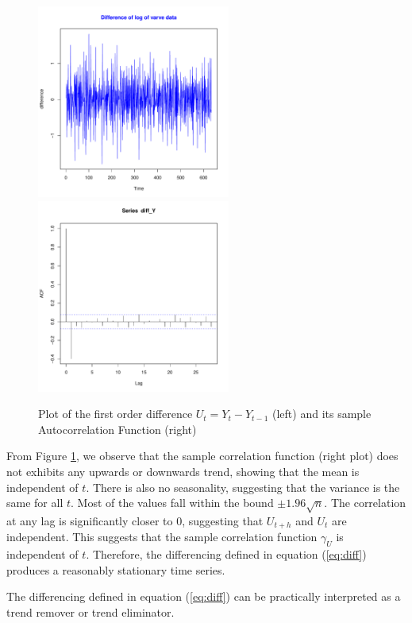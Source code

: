 \documentclass[11pt, oneside]{article}   	%
\begin{document}
\begin{figure}[H] %
   \centering
   \includegraphics[width=2.5in]{diff} 
    \includegraphics[width=2.5in]{acf_diff_Y} 
   \caption{Plot of the first order difference $U_{t}=Y_{t}-Y_{t-1}$ (left) and its sample Autocorrelation Function (right)}
   \label{fig:diff_acf}
\end{figure}
\begin{flushleft}
From Figure \ref{fig:diff_acf}, we observe that the sample correlation function (right plot) does not exhibits any upwards or downwards trend, showing that the mean is independent of $t$. There is also no seasonality, suggesting that the variance is the same for all $t$. Most of the values fall within the bound $\pm1.96\sqrt{n}$. The correlation at any lag is significantly closer to 0, suggesting that $U_{t+h}$ and $U_{t}$ are independent. This suggests that the sample correlation function $\gamma_{U}$ is independent of $t$. Therefore, the differencing 
defined in equation (\ref{eq:diff}) produces a reasonably stationary time series.
\end{flushleft}
\begin{flushleft}
The differencing defined in equation  (\ref{eq:diff}) can be practically interpreted as a trend remover or trend eliminator.
\end{flushleft}
\end{document}
